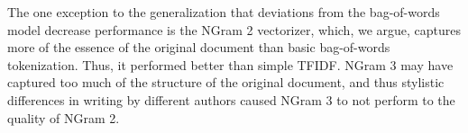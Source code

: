 \documentclass{acm_proc_article-sp}
\begin{document}
The one exception to the generalization that deviations from the bag-of-words model decrease performance is the NGram 2 vectorizer, which, we argue, captures more of the essence of the original document than basic bag-of-words tokenization. Thus, it performed better than simple TFIDF. NGram 3 may have captured too much of the structure of the original document, and thus stylistic differences in writing by different authors caused NGram 3 to not perform to the quality of NGram 2.


%

%
%
\end{document}
